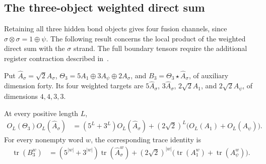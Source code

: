 \subsection{The three-object weighted direct sum}

Retaining all three hidden bond objects gives four fusion channels,
since $\sigma\otimes\sigma=1\oplus\psi$. The following result concerns
the local product of the weighted direct sum with the $\sigma$ strand.
The full boundary tensors require the additional register
contraction described in~\cite{gap:tnlean_ising_three_object_twist_scope}.

\begin{definition}%
    \label{def:asymex_ising_three_product}
    \leanok
    Put $\widehat A_\sigma=\sqrt2A_\sigma$,
    $\Theta_3=5A_1\oplus3A_\psi\oplus2A_\sigma$, and
    $B_3=\Theta_3\star\widehat A_\sigma$, of auxiliary dimension forty.
    Its four weighted targets are
    $5\widehat A_\sigma$, $3\widehat A_\sigma$,
    $2\sqrt2A_1$, and $2\sqrt2A_\psi$, of dimensions $4,4,3,3$.
\end{definition}

\begin{lemma}%
    \label{thm:asymex_ising_three_trace}
    \leanok
    At every positive length $L$,
    \begin{align}
        O_L(\Theta_3)O_L(\widehat A_\sigma)
         & = (5^L+3^L)O_L(\widehat A_\sigma)
        +(2\sqrt2)^L\bigl(O_L(A_1)+O_L(A_\psi)\bigr).
        \label{eq:asymex_ising_three_product}
    \end{align}
    For every nonempty word $w$, the corresponding trace identity is
    \begin{align}
        \operatorname{tr}(B_3^w)
         & = (5^{|w|}+3^{|w|})\operatorname{tr}(\widehat A_\sigma^w)
        +(2\sqrt2)^{|w|}
        \bigl(\operatorname{tr}(A_1^w)+\operatorname{tr}(A_\psi^w)\bigr).
        \label{eq:asymex_ising_three_trace}
    \end{align}
\end{lemma}

